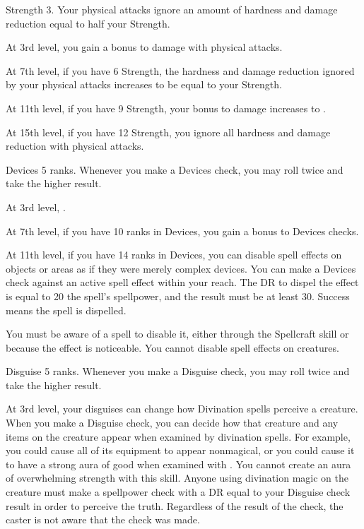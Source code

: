     \featpres Strength 3.
    \featben Your physical attacks ignore an amount of hardness and damage reduction equal to half your Strength.

    At 3rd level, you gain a  bonus to damage with physical attacks.

    At 7th level, if you have 6 Strength, the hardness and damage reduction ignored by your physical attacks increases to be equal to your Strength.

    At 11th level, if you have 9 Strength, your bonus to damage increases to .

    At 15th level, if you have 12 Strength, you ignore all hardness and damage reduction with physical attacks.

    \featpre Devices 5 ranks.
    \featben Whenever you make a Devices check, you may roll twice and take the higher result.

    At 3rd level, \tdash.

    At 7th level, if you have 10 ranks in Devices, you gain a  bonus to Devices checks.

    At 11th level, if you have 14 ranks in Devices, you can disable spell effects on objects or areas as if they were merely complex devices.
    You can make a Devices check against an active spell effect within your reach.
    The DR to dispel the effect is equal to 20 \add the spell's spellpower, and the result must be at least 30.
    Success means the spell is dispelled.

    You must be aware of a spell to disable it, either through the Spellcraft skill or because the effect is noticeable.
    You cannot disable spell effects on creatures.

    \featpre Disguise 5 ranks.
    \featben Whenever you make a Disguise check, you may roll twice and take the higher result.

    At 3rd level, your disguises can change how Divination spells perceive a creature.
    When you make a Disguise check, you can decide how that creature and any items on the creature appear when examined by divination spells.
    For example, you could cause all of its equipment to appear nonmagical, or you could cause it to have a strong aura of good when examined with .
    You cannot create an aura of overwhelming strength with this skill.
    Anyone using divination magic on the creature must make a spellpower check with a DR equal to your Disguise check result in order to perceive the truth.
    Regardless of the result of the check, the caster is not aware that the check was made.

